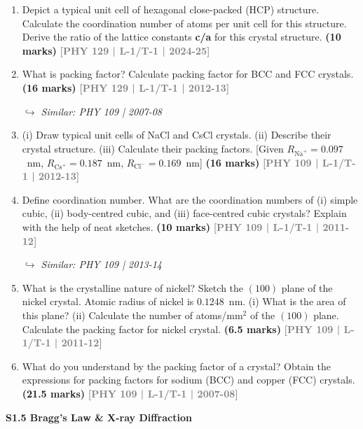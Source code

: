 \documentclass[12pt,a3paper]{article}
\newcommand{\yr}[1]{\hfill\textcolor{gray}{\small\textbf{[#1]}}}
\newcommand{\mk}[1]{\textcolor{orange!70!black}{\small\textbf{(#1 marks)}}}
\newcommand{\variant}[1]{\par\vspace{1pt}\textcolor{blue!50!black}%
  {\footnotesize\textit{$\hookrightarrow$ Similar: #1}}}
\newcommand{\subtopic}[2]{%
  \vspace{10pt}
  \noindent\begin{tcolorbox}[colback=#1!8,colframe=#1,boxrule=0.6pt,arc=4pt,
    left=6pt,right=6pt,top=4pt,bottom=4pt]
    \small\bfseries\textcolor{#1}{#2}
  \end{tcolorbox}
  \vspace{2pt}
}
\begin{document}
\begin{enumerate}

\item Depict a typical unit cell of hexagonal close-packed (HCP) structure. Calculate
the coordination number of atoms per unit cell for this structure. Derive the ratio
of the lattice constants \textbf{c/a} for this crystal structure.  
\mk{10} \yr{PHY 129 | L-1/T-1 | 2024-25}


\item What is packing factor? Calculate packing factor for BCC and FCC crystals.
\mk{16} \yr{PHY 129 | L-1/T-1 | 2012-13}
\variant{PHY 109 | 2007-08}

\item (i) Draw typical unit cells of NaCl and CsCl crystals. (ii) Describe their crystal structure. (iii) Calculate their packing factors. [Given $R_{\text{Na}^+} = 0.097$~nm, $R_{\text{Cs}^+} = 0.187$~nm, $R_{\text{Cl}^-} = 0.169$~nm]
\mk{16} \yr{PHY 109 | L-1/T-1 | 2012-13}

\item Define coordination number. What are the coordination numbers of (i) simple cubic, (ii) body-centred cubic, and (iii) face-centred cubic crystals? Explain with the help of neat sketches.
\mk{10} \yr{PHY 109 | L-1/T-1 | 2011-12}
\variant{PHY 109 | 2013-14}

\item What is the crystalline nature of nickel? Sketch the $(100)$ plane of the nickel crystal. Atomic radius of nickel is $0.1248$~nm. (i) What is the area of this plane? (ii) Calculate the number of atoms/mm$^2$ of the $(100)$ plane. Calculate the packing factor for nickel crystal.
\mk{6.5} \yr{PHY 109 | L-1/T-1 | 2011-12}

\item What do you understand by the packing factor of a crystal? Obtain the expressions for packing factors for sodium (BCC) and copper (FCC) crystals.
\mk{21.5} \yr{PHY 109 | L-1/T-1 | 2007-08}

\end{enumerate}
\label{sec:s15}
\subtopic{cA}{S1.5 \quad Bragg's Law \& X-ray Diffraction}
\end{document}
